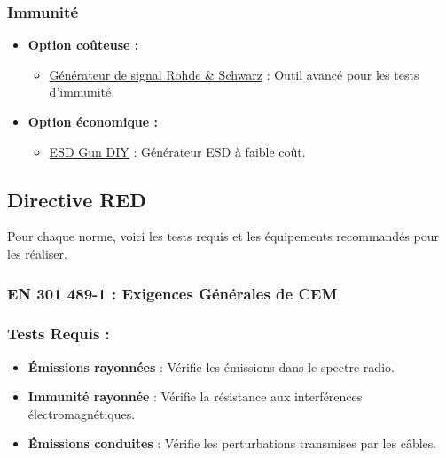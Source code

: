 \documentclass[a4paper,12pt]{article}
\begin{document}
\subsubsection{Immunité}
\begin{itemize}
    \item \textbf{Option coûteuse :}
          \begin{itemize}
              \item \href{https://www.keysight.com/us/en/assets/7018-05702/technical-overviews/5992-2241.pdf}{Générateur de signal Rohde \& Schwarz} : Outil avancé pour les tests d’immunité.
          \end{itemize}
    \item \textbf{Option économique :}
          \begin{itemize}
              \item \href{https://www.crowdsupply.com/era-instruments/erasynth-micro}{ESD Gun DIY} : Générateur ESD à faible coût.
          \end{itemize}
\end{itemize}

\newpage

\subsection{Directive RED}
Pour chaque norme, voici les tests requis et les équipements recommandés pour les réaliser.

\subsubsection{EN 301 489-1 : Exigences Générales de CEM}
\subsubsection*{Tests Requis :}
\begin{itemize}
    \item \textbf{Émissions rayonnées} : Vérifie les émissions dans le spectre radio.
    \item \textbf{Immunité rayonnée} : Vérifie la résistance aux interférences électromagnétiques.
    \item \textbf{Émissions conduites} : Vérifie les perturbations transmises par les câbles.
\end{itemize}
\end{document}

